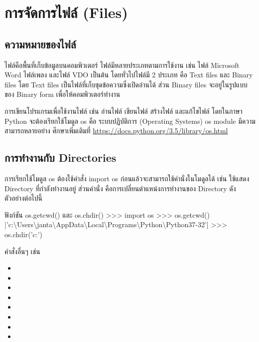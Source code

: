 \chapter{การจัดการไฟล์ (Files)}
\section{ความหมายของไฟล์}

ไฟล์คือพื้นที่เก็บข้อมูลบนคอมพิวเตอร์ ไฟล์มีหลายประเภทตามการใช้งาน เช่น ไฟล์ Microsoft Word ไฟล์เพลง และไฟล์ VDO เป็นต้น โดยทั่วไปไฟล์มี 2 ประเภท คือ Text files และ Binary files โดย Text files เป็นไฟล์ที่เก็บชุดข้อความซึ่งเปิดอ่านได้ ส่วน Binary files จะอยู่ในรูปแบบของ Binary form เพื่อให้คอมพิวเตอร์ทำงาน

การเขียนโปรแกรมเพื่อใช้งานไฟล์ เช่น อ่านไฟล์ เขียนไฟล์ สร้างไฟล์ และแก้ไขไฟล์ โดยในภาษา Python จะต้องเรียกใช้โมดูล os คือ ระบบปฏิบัติการ (Operating Systems) os module มีความสามารถหลายอย่าง ศึกษาเพิ่มเติมที่ \url{https://docs.python.org/3.5/library/os.html}

\section{การทำงานกับ Directories}

การเรียกใช้โมดูล os ต้องใช้คำสั่ง import os ก่อนแล้วจะสามารถใช้คำนั่งในโมดูลได้ เช่น   ใช้แสดง Directory ที่กำลังทำงานอยู่ ส่วนคำนั่ง   คือการเปลี่ยนตำแหน่งการทำงานของ Directory ดังตัวอย่างต่อไปนี้

\begin{codelist}{ฟังก์ชัน os.getcwd() และ os.chdir()}{}
>>> import os
>>> os.getcwd()
|\rq{}c:\textbackslash{}Users\textbackslash{}janta\textbackslash{}AppData\textbackslash{}Local\textbackslash{}Programs\textbackslash{}Python\textbackslash{}Python37-32\rq{}|
>>> os.chdir('c:\Users\janta\Desktop')

\end{codelist}

คำสั่งอื่นๆ เช่น 

\begin{itemize}
\item 	{}
\item 	{}
\item 	{}
\item 	{}
\item 	{} 
\item 	{} 
\item 	{} 
\item 	{}
\end{itemize}

